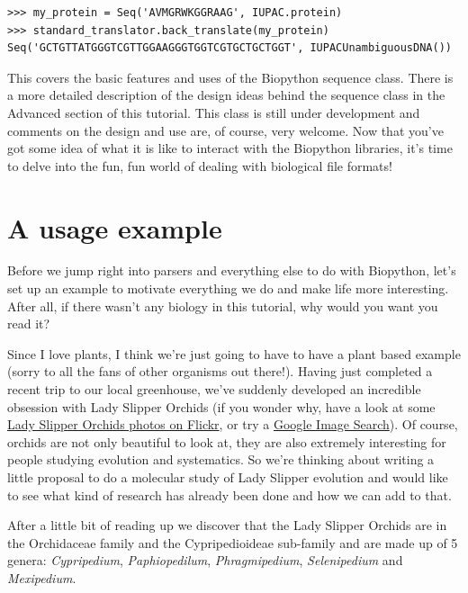 \documentclass{report}
\begin{document}
\begin{verbatim}
>>> my_protein = Seq('AVMGRWKGGRAAG', IUPAC.protein)
>>> standard_translator.back_translate(my_protein)
Seq('GCTGTTATGGGTCGTTGGAAGGGTGGTCGTGCTGCTGGT', IUPACUnambiguousDNA())
\end{verbatim}

This covers the basic features and uses of the Biopython sequence class. There is a more detailed description of the design ideas behind the sequence class in the Advanced section of this tutorial. This class is still under development and comments on the design and use are, of course, very welcome. Now that you've got some idea of what it is like to interact with the Biopython libraries, it's time to delve into the fun, fun world of dealing with biological file formats!

\section{A usage example}
\label{sec:orchids}

Before we jump right into parsers and everything else to do with Biopython, let's set up an example to motivate everything we do and make life more interesting. After all, if there wasn't any biology in this tutorial, why would you want you read it?

Since I love plants, I think we're just going to have to have a plant based example (sorry to all the fans of other organisms out there!).  Having just completed a recent trip to our local greenhouse, we've suddenly developed an incredible obsession with Lady Slipper Orchids (if you wonder why, have a look at some \href{http://www.flickr.com/search/?q=lady+slipper+orchid&s=int&z=t}{Lady Slipper Orchids photos on Flickr}, or try a \href{http://images.google.com/images?q=lady%20slipper%20orchid}{Google Image Search}).  Of course, orchids are not only beautiful to look at, they are also extremely interesting for people studying evolution and systematics. So we're thinking about writing a little proposal to do a molecular study of Lady Slipper evolution and would like to see what kind of research has already been done and how we can add to that.


After a little bit of reading up we discover that the Lady Slipper Orchids are in the Orchidaceae family and the Cypripedioideae sub-family and are made up of 5 genera:  \emph{Cypripedium}, \emph{Paphiopedilum}, \emph{Phragmipedium}, \emph{Selenipedium} and \emph{Mexipedium}.
\end{document}
